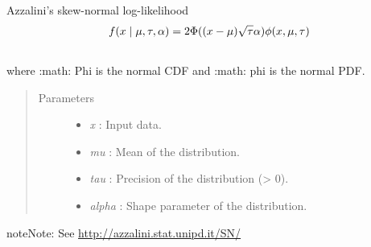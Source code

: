 \documentclass[letterpaper,10pt,english]{sphinxmanual}
\begin{document}
\begin{fulllineitems}
\label{distributions:pymc.distributions.skew_normal_like}
Azzalini's skew-normal log-likelihood
\begin{gather}
\begin{split}f(x \mid \mu, \tau, \alpha) = 2 \Phi((x-\mu)\sqrt{\tau}\alpha) \phi(x,\mu,\tau)\end{split}\notag\\\begin{split}\end{split}\notag
\end{gather}
where :math: Phi is the normal CDF and :math: phi is the normal PDF.
\begin{quote}\begin{description}
\item[{Parameters }] \leavevmode\begin{itemize}
\item {} 
\emph{x} : Input data.

\item {} 
\emph{mu} : Mean of the distribution.

\item {} 
\emph{tau} : Precision of the distribution (\textgreater{} 0).

\item {} 
\emph{alpha} : Shape parameter of the distribution.

\end{itemize}

\end{description}\end{quote}

\begin{notice}{note}{Note:}
See \href{http://azzalini.stat.unipd.it/SN/}{http://azzalini.stat.unipd.it/SN/}
\end{notice}

\end{fulllineitems}

\end{document}
